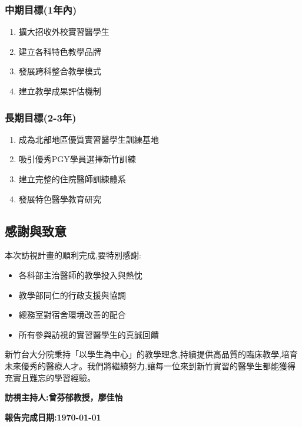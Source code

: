 \documentclass[12pt,a4paper]{article}
\newcommand{\mydate}{\today}
\begin{document}
\subsubsection{中期目標(1年內)}

\begin{enumerate}[leftmargin=*]
\item 擴大招收外校實習醫學生
\item 建立各科特色教學品牌
\item 發展跨科整合教學模式
\item 建立教學成果評估機制
\end{enumerate}

\subsubsection{長期目標(2-3年)}

\begin{enumerate}[leftmargin=*]
\item 成為北部地區優質實習醫學生訓練基地
\item 吸引優秀PGY學員選擇新竹訓練
\item 建立完整的住院醫師訓練體系
\item 發展特色醫學教育研究
\end{enumerate}

\subsection{感謝與致意}

本次訪視計畫的順利完成,要特別感謝:

\begin{itemize}[leftmargin=*]
\item 各科部主治醫師的教學投入與熱忱
\item 教學部同仁的行政支援與協調
\item 總務室對宿舍環境改善的配合
\item 所有參與訪視的實習醫學生的真誠回饋
\end{itemize}

新竹台大分院秉持「以學生為中心」的教學理念,持續提供高品質的臨床教學,培育未來優秀的醫療人才。我們將繼續努力,讓每一位來到新竹實習的醫學生都能獲得充實且難忘的學習經驗。

\vspace{1cm}

\begin{flushright}
\textbf{訪視主持人:曾芬郁教授，廖佳怡}

\textbf{報告完成日期:\mydate}
\end{flushright}
\end{document}
